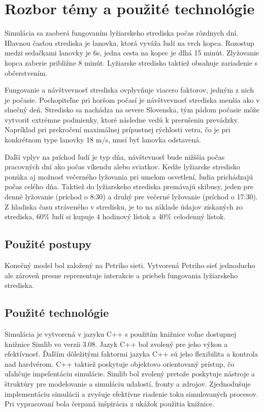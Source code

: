 \section{Rozbor témy a použité technológie} \label{sec:rozbor}
Simulácia sa zaoberá fungovaním lyžiarskeho strediska počas rôzdnych dní. Hlavnou časťou strediska je 
lanovka, ktorá vyváža ľudí na vrch kopca. Rozostup medzi sedačkami lanovky je 6s, jedna cesta na kopec je dlhá 15 minút.
Zlyžovanie kopca zaberie približne 8 minút. 
Lyžiarske stredisko taktiež obsahuje zariadenie s občerstvením.\par
Fungovanie a návštvevnosť strediska ovplyvňuje viacero faktorov, jedným z nich je počasie. Pochopiteľne pri horšom 
počasí je návštvevnosť strediska menšia ako v slnečný deň. Stredisko sa nachádza na severe Slovenska, tým pádom počasie môže vytvoriť
extrémne podmienky, ktoré následne vedú k prerušeniu prevádzky. Napríklad  pri prekročení maximálnej prípustnej rýchlosti vetra,
čo je pri konkrétnom type lanovky 18 m/s, musí byť lanovka odstavená.\par
Daľší vplyv na príchod ľudí je typ dňa, návštevnosť bude nižššia počas pracovných dní ako počas víkendu alebo sviatkov. 
Kedže lyžiarske stredisko ponúka aj možnosť večerného lyžovania pri umelom osvetlení, ľudia prichádzajú počas celého dňa.
Taktiež do lyžiarskeho strediska premávajú skibusy, jeden pre denné lyžovanie (príchod o 8:30) a 
druhý pre večerné lyžovanie (príchod o 17:30).
Z hladiska času stráveného v stredisku, je to na základe údajov získaných zo strediska, 60\% ľudí si kupuje 4 hodinový lístok a 40\% celodenný lístok. 

\subsection{Použité postupy}
Konečný model\cite[str. 6]{ims} bol založený na Petriho sieti\cite[str. 31]{ims}. Vytvorená Petriho sieť jednoducho ale zároveň presne reprezentuje interakcie a priebeh fungovania lyžiarskeho strediska.


\subsection{Použité technológie}
Simulácia je vytvorená v jazyku C++ s použitím knižnice voľne dostupnej knižnice Simlib vo verzii 3.08. Jazyk C++ bol zvolený pre jeho výkon a efektívnosť. Ďaľším dôležitými faktormi jazyka C++ sú jeho flexibilita a kontrola nad hardvérom. C++ taktiež poskytuje objektovo orientovaný prístup, čo uľahčuje impelentáciu simulácie. Simlib bol zvolený pretože poskytuje nástroje a štruktúry pre modelovanie a simuláciu udalostí, fronty a zdrojov. 
Zjednodušuje implementáciu simulácii a zvyšuje efektívne riadenie toku simulovaných procesov. Pri vypracovaní bola čerpaná inšpirácia
z ukážok použitia knižnice\cite{simlib}.
